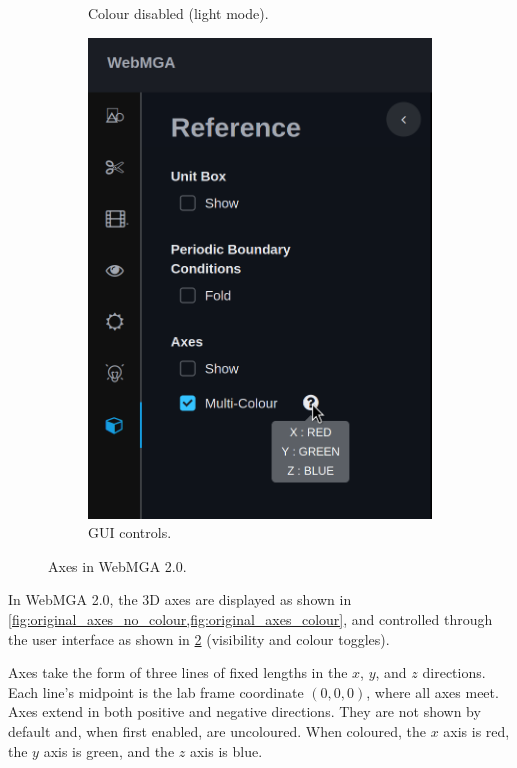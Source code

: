 \begin{figure}
\begin{center}
\begin{subfigure}{0.4\textwidth}
      \caption{Colour disabled (light mode).}
      \label{fig:original_axes_no_colour_bad}
    \end{subfigure}
    \begin{subfigure}{0.4\textwidth}
      \includegraphics[width=\linewidth]{assets/images/axes/2_gui}
      \caption{GUI controls.}
      \label{fig:original_axes_controls}
    \end{subfigure} 
  \end{center}
  \caption{Axes in WebMGA 2.0.}
  \label{fig:original_axes}
\end{figure}

In WebMGA 2.0, the 3D axes are displayed as shown in \cref{fig:original_axes_no_colour,fig:original_axes_colour}, and controlled through the user interface as shown in \cref{fig:original_axes_controls} (visibility and colour toggles).

Axes take the form of three lines of fixed lengths in the $x$, $y$, and $z$ directions. Each line's midpoint is the lab frame coordinate $(0, 0, 0)$, where all axes meet. Axes extend in both positive and negative directions. They are not shown by default and, when first enabled, are uncoloured. When coloured, the $x$ axis is red, the $y$ axis is green, and the $z$ axis is blue.

